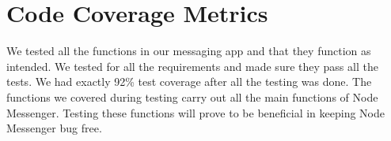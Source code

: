 \documentclass[12pt, titlepage]{article}
\begin{document}
\section{Code Coverage Metrics}
We tested all the functions in our messaging app and that they function as intended. We tested for all the requirements and made sure they pass all the tests. We had exactly 92\% test coverage after all the testing was done. The functions we covered during testing carry out all the main functions of Node Messenger. Testing these functions will prove to be beneficial in keeping Node Messenger bug free.




\end{document}
